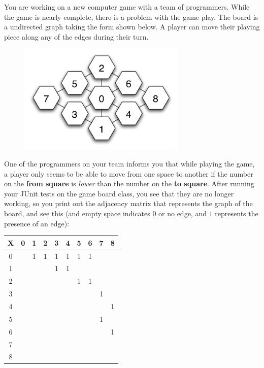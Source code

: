 \documentclass[11pt]{exam}
\begin{document}
\begin{questions}
\newpage
\question You are working on a new computer game with a team of programmers.   While the game is nearly complete, there is a problem with the game play.  The board is a undirected graph taking the form shown below.   A player can move their playing piece along any of the edges during their turn.
\begin{figure}[htbp]
	\begin{center}
	   \includegraphics[width=3.15in]{final_game_question}
	\end{center}   
\end{figure}
One of the programmers on your team informs you that while playing the game, a player only seems to be able to move from one space to another if the number on the {\bf from square} is {\it lower} than the number on the {\bf to square}.  After running your JUnit tests on the game board class, you see that they are no longer working, so you print out the adjacency matrix that represents the graph of the board, and see this (and empty space indicates $0$ or no edge, and $1$ represents the presence of an edge): \newline
\begin{center}
\begin{tabular}{|c||c|c|c|c|c|c|c|c|c|} \hline
 X & 0 & 1 & 2 & 3 & 4 & 5 & 6 & 7 & 8 \\ \hline \hline
 0 &   & 1 & 1 & 1 & 1 & 1 & 1 &   &   \\ \hline
 1 &   &   &	& 1 & 1 &   &   &   &   \\ \hline
 2 &   &   &	&   &   & 1 & 1 &   &   \\ \hline
 3 &   &   &	&   &   &   &   & 1 &   \\ \hline
 4 &   &   &	&   &   &   &   &   & 1 \\ \hline
 5 &   &   &	&   &   &   &   & 1 &   \\ \hline
 6 &   &   &	&   &   &   &   &   & 1 \\ \hline
 7 &   &   &	&   &   &   &   &   &   \\ \hline
 8 &   &   &	&   &   &   &   &   &   \\ \hline
\end{tabular}
\end{center}



\end{questions}
\end{document}
